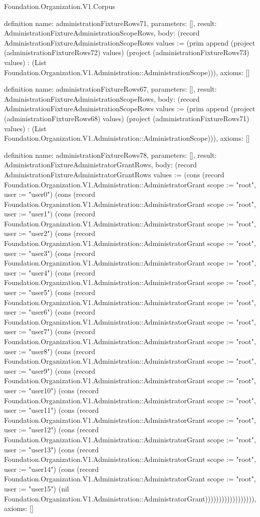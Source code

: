 \begin{lexlean}{Foundation.Organization.V1.Corpus}
\begin{semanticmodule}
definition{
  name: administrationFixtureRows71,
  parameters: [],
  result: AdministrationFixtureAdministrationScopeRows,
  body: (record AdministrationFixtureAdministrationScopeRows {values := (prim append (project (administrationFixtureRows72) values) (project (administrationFixtureRows73) values) : (List Foundation.Organization.V1.Administration::AdministrationScope))}),
  axioms: []
}

definition{
  name: administrationFixtureRows67,
  parameters: [],
  result: AdministrationFixtureAdministrationScopeRows,
  body: (record AdministrationFixtureAdministrationScopeRows {values := (prim append (project (administrationFixtureRows68) values) (project (administrationFixtureRows71) values) : (List Foundation.Organization.V1.Administration::AdministrationScope))}),
  axioms: []
}

definition{
  name: administrationFixtureRows78,
  parameters: [],
  result: AdministrationFixtureAdministratorGrantRows,
  body: (record AdministrationFixtureAdministratorGrantRows {values := (cons (record Foundation.Organization.V1.Administration::AdministratorGrant {scope := "root", user := "user0"}) (cons (record Foundation.Organization.V1.Administration::AdministratorGrant {scope := "root", user := "user1"}) (cons (record Foundation.Organization.V1.Administration::AdministratorGrant {scope := "root", user := "user2"}) (cons (record Foundation.Organization.V1.Administration::AdministratorGrant {scope := "root", user := "user3"}) (cons (record Foundation.Organization.V1.Administration::AdministratorGrant {scope := "root", user := "user4"}) (cons (record Foundation.Organization.V1.Administration::AdministratorGrant {scope := "root", user := "user5"}) (cons (record Foundation.Organization.V1.Administration::AdministratorGrant {scope := "root", user := "user6"}) (cons (record Foundation.Organization.V1.Administration::AdministratorGrant {scope := "root", user := "user7"}) (cons (record Foundation.Organization.V1.Administration::AdministratorGrant {scope := "root", user := "user8"}) (cons (record Foundation.Organization.V1.Administration::AdministratorGrant {scope := "root", user := "user9"}) (cons (record Foundation.Organization.V1.Administration::AdministratorGrant {scope := "root", user := "user10"}) (cons (record Foundation.Organization.V1.Administration::AdministratorGrant {scope := "root", user := "user11"}) (cons (record Foundation.Organization.V1.Administration::AdministratorGrant {scope := "root", user := "user12"}) (cons (record Foundation.Organization.V1.Administration::AdministratorGrant {scope := "root", user := "user13"}) (cons (record Foundation.Organization.V1.Administration::AdministratorGrant {scope := "root", user := "user14"}) (cons (record Foundation.Organization.V1.Administration::AdministratorGrant {scope := "root", user := "user15"}) (nil Foundation.Organization.V1.Administration::AdministratorGrant)))))))))))))))))}),
  axioms: []
}


\end{semanticmodule}
\end{lexlean}
